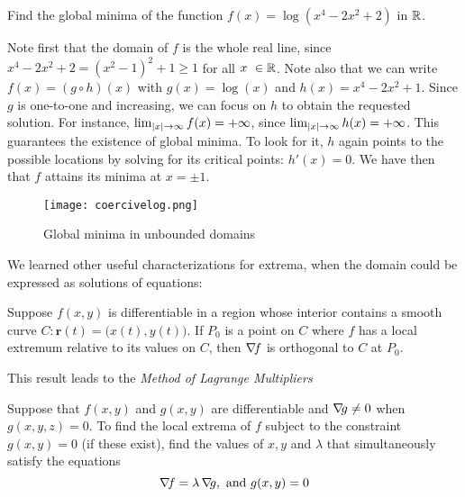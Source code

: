 \begin{example}
Find the global minima of the function $f(x)= \log (x^4-2x^2+2)$ in $\mathbb{R}$.  

Note first that the domain of $f$ is the whole real line, since $x^4-2x^2+2 = (x^2-1)^2+1 \geq 1$ for all $x\ \in \mathbb{R}$.  Note also that we can write $f(x) = (g \circ h)(x)$ with $g(x) = \log(x)$ and $h(x)=x^4-2x^2+1$.  Since $g$ is one-to-one and increasing, we can focus on $h$ to obtain the requested solution.  For instance, $\lim_{\lvert x \rvert\to\infty}f(x) = +\infty$, since $\lim_{\lvert x \rvert\to\infty} h(x) = +\infty$. This guarantees the existence of global minima.  To look for it, $h$ again points to the possible locations by solving for its critical points: $h'(x)=0$.  We have then that $f$ attains its minima at $x=\pm 1$.
\begin{figure}[ht!]
\begin{center}
\texttt{[image: coercivelog.png]}
\end{center}
\caption{Global minima in unbounded domains}
\label{figure:coercivelog}
\end{figure}
\end{example}

We learned other useful characterizations for extrema, when the domain could be expressed as solutions of equations:

\begin{theorem}\label{theorem:OrthogonalGradient}
Suppose $f(x,y)$ is differentiable in a region whose interior contains a smooth curve $C\colon \boldsymbol{r}(t) = \big( x(t), y(t) \big)$.  If $P_0$ is a point on $C$ where $f$ has a local extremum relative to its values on $C$, then $\mathop{\nabla\! {f}}$ is orthogonal to $C$ at $P_0$.
\end{theorem}

This result leads to the \emph{Method of Lagrange Multipliers}

\begin{theorem}\label{theorem:LM1C}
Suppose that $f(x,y)$ and $g(x,y)$ are differentiable and $\mathop{\nabla\! {g}} \neq 0$ when $g(x,y,z)=0$.  To find the local extrema of $f$ subject to the constraint $g(x,y)=0$ (if these exist), find the values of $x,y$ and $\lambda$ that simultaneously satisfy the equations
\begin{equation*}
\mathop{\nabla\! {f}} = \lambda \mathop{\nabla\! {g}}, \text{ and }g(x,y)=0
\end{equation*}
\end{theorem}

